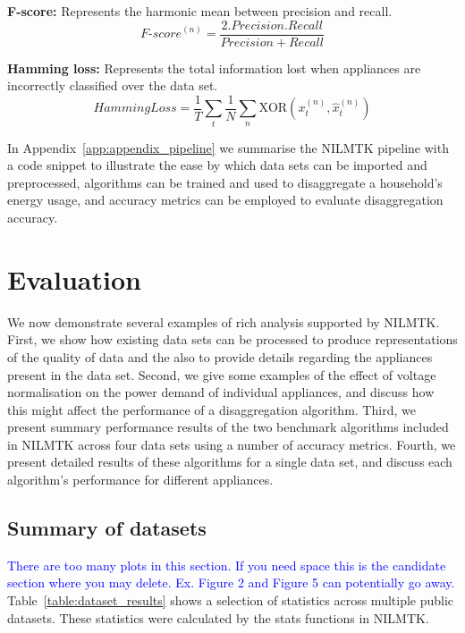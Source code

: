 \documentclass{sig-alternate}
\newcommand{\bluecolor}[1]{\textcolor{blue}{#1}}
\newcommand{\appref}[1]{Appendix~\ref{#1}}
\newcommand{\tabref}[1]{Table~\ref{#1}}
\begin{document}
\textbf{F-score:} Represents the harmonic mean between precision and recall.
\begin{equation}
\mathit{F\text{-}score}^{(n)} = \frac
            {2 . \mathit{Precision} . \mathit{Recall}}
            {\mathit{Precision} + \mathit{Recall}}
\end{equation}

\textbf{Hamming loss:} Represents the total information lost when appliances are incorrectly classified over the data set.
\begin{equation}
\mathit{HammingLoss} = 
        \frac{1}{T} \sum_{t}
        \frac{1}{N} \sum_{n}
        \mathrm{XOR} \left ( x^{(n)}_t, \hat{x}^{(n)}_t \right )
\end{equation}



\noindent
In \appref{app:appendix_pipeline} we summarise the NILMTK pipeline with a code snippet to illustrate the ease by which data sets can be imported and preprocessed, algorithms can be trained and used to disaggregate a household's energy usage, and accuracy metrics can be employed to evaluate disaggregation accuracy.


\section{Evaluation}
\label{evaluation}

\noindent
We now demonstrate several examples of rich analysis supported by NILMTK. First, we show how existing data sets can be processed to produce representations of the quality of data and the also to provide details regarding the appliances present in the data set. Second, we give some examples of the effect of voltage normalisation on the power demand of individual appliances, and discuss how this might affect the performance of a disaggregation algorithm. Third, we present summary performance results of the two benchmark algorithms included in NILMTK across four data sets using a number of accuracy metrics. Fourth, we present detailed results of these algorithms for a single data set, and discuss each algorithm's performance for different appliances.

\subsection{Summary of datasets}
\bluecolor{There are too many plots in this section. If you need space this is the candidate section where you may delete. Ex. Figure 2 and Figure 5 can potentially go away.}
\noindent
\tabref{table:dataset_results} shows a selection of statistics
across multiple public datasets.  These statistics were calculated by
the stats functions in NILMTK.  
\end{document}
